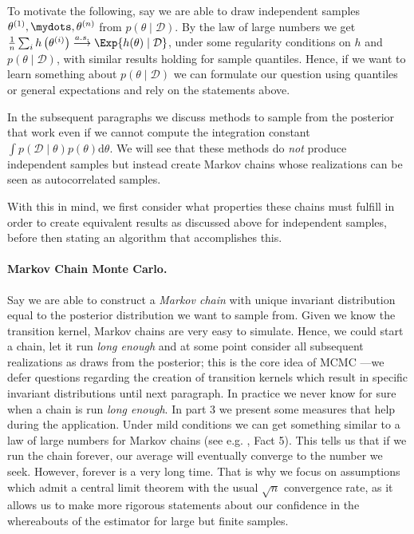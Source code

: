 To motivate the following, say we are able to draw independent samples $\theta^{(1)}, \mydots, \theta^{(n)}$ from $p(\theta \mid \mathcal{D})$.
By the law of large numbers we get $\frac{1}{n} \sum_i h\left(\theta^{(i)}\right) \overset{a.s.}{\longrightarrow} \Exp{h(\theta) \mid \mathcal{D}}$, under some regularity conditions on $h$ and $p(\theta \mid \mathcal{D})$, with similar results holding for sample quantiles.
Hence, if we want to learn something about $p(\theta \mid \mathcal{D})$ we can formulate our question using quantiles or general expectations and rely on the statements above.

In the subsequent paragraphs we discuss methods to sample from the posterior that work even if we cannot compute the integration constant $\int p(\mathcal{D} \mid \theta) p(\theta) \mathrm{d}\theta$.
We will see that these methods do \emph{not} produce independent samples but instead create Markov chains whose realizations can be seen as autocorrelated samples.

With this in mind, we first consider what properties these chains must fulfill in order to create equivalent results as discussed above for independent samples, before then stating an algorithm that accomplishes this.

\paragraph{Markov Chain Monte Carlo.}
Say we are able to construct a \emph{Markov chain} with unique invariant distribution equal to the posterior distribution we want to sample from.
Given we know the transition kernel, Markov chains are very easy to simulate.
Hence, we could start a chain, let it run \emph{long enough} and at some point consider all subsequent realizations as draws from the posterior; this is the core idea of MCMC ---we defer questions regarding the creation of transition kernels which result in specific invariant distributions until next paragraph.
In practice we never know for sure when a chain is run \emph{long enough}.
In part 3 we present some measures that help during the application.
Under mild conditions we can get something similar to a law of large numbers for Markov chains (see e.g. \citet{roberts2004}, Fact 5).
This tells us that if we run the chain forever, our average will eventually converge to the number we seek.
However, forever is a very long time.
That is why we focus on assumptions which admit a central limit theorem with the usual $\sqrt{n}$ convergence rate, as it allows us to make more rigorous statements about our confidence in the whereabouts of the estimator for large but finite samples.

